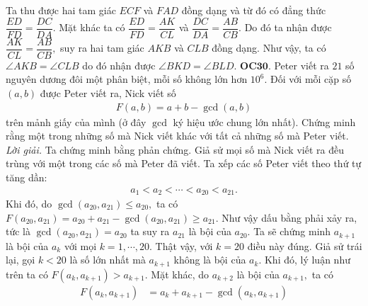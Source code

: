 \begin{multicols}{2}
\begin{figure}[H]
 		\vspace*{-5pt}
 	\end{figure}
	Ta thu được hai tam giác $ECF$ và $FAD$ đồng dạng và từ đó có đẳng thức $\dfrac{ED}{FD} = \dfrac{DC}{DA}.$ Mặt khác ta có $\dfrac{ED}{FD} = \dfrac{AK}{CL}$ và $\dfrac{DC}{DA}=\dfrac{AB}{CB}.$ Do đó ta nhận được $\dfrac{AK}{CL}=\dfrac{AB}{CB},$  suy ra hai tam giác $AKB$ và $CLB$ đồng dạng. 
	\vskip 0.1cm
	Như vậy, ta có $\angle AKB=\angle CLB$ do đó nhận được   $\angle BKD = \angle BLD.$
	\vskip 0.1cm
	{\bf\color{cackithi} OC$\pmb{30.}$} Peter viết ra $21$ số nguyên dương đôi một phân biệt, mỗi số không lớn hơn $10^6$. Đối với mỗi cặp số $(a, b)$ được Peter viết ra, Nick  viết  số
	\begin{align*}
		F(a, b) = a + b - \gcd (a, b)
	\end{align*}
	trên mảnh giấy của mình (ở đây $\gcd$ ký hiệu ước chung lớn nhất). 
	\vskip 0.1cm
	Chứng minh rằng một trong những số mà Nick viết khác với tất cả những  số mà Peter viết. 
	\vskip 0.1cm
	\textit{Lời giải.} Ta chứng minh bằng phản chứng. Giả sử mọi số mà Nick viết ra đều trùng với một trong các số mà Peter đã viết. Ta xếp các số Peter viết theo thứ tự tăng dần:
	\begin{align*}
		a_1 < a_2 < \cdots < a_{20} < a_{21}.
	\end{align*}
	Khi đó, do $\gcd (a_{20}, a_{21}) \le a_{20},$ ta có  $F(a_{20}, a_{21}) = a_{20} + a_{21} - \gcd (a_{20}, a_{21})\ge a_{21}.$ Như vậy dấu bằng phải xảy ra, tức là $\gcd (a_{20}, a_{21}) = a_{20}$ ta suy ra $a_{21}$ là bội của $a_{20}.$
	\vskip 0.1cm
	Ta sẽ chứng minh $a_{k+1}$ là bội của $a_k$ với mọi $k=1, \cdots, 20.$ Thật vậy, với $k=20$ điều này đúng. Giả sử trái lại, gọi $k<20$ là số lớn nhất mà $a_{k+1}$ không là bội của $a_k.$ Khi đó, lý luận như trên ta có $F(a_{k}, a_{k+1})>a_{k+1}$. Mặt khác, do $a_{k+2}$ là bội của $a_{k+1},$ ta có 
	\begin{align*}
		F(a_{k}, a_{k+1}) &= a_{k} + a_{k+1} - \gcd (a_{k}, a_{k+1})\\

\end{align*}
\end{multicols}
